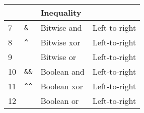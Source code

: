 \begin{table}[h]
\begin{tabular}{|l|l|l|l|}
  & \texttt{\detokenize{!=}} & Inequality & \\
\hline
7 & \texttt{\&} & Bitwise and & Left-to-right \\
\hline
8 & \texttt{\^} & Bitwise xor & Left-to-right \\
\hline
9 & \texttt{\detokenize{|}} & Bitwise or & Left-to-right \\
\hline
10 & \texttt{\&\&} & Boolean and & Left-to-right \\
\hline
11 & \texttt{\^}\texttt{\^} & Boolean xor & Left-to-right \\
\hline
12 & \texttt{\detokenize{||}} & Boolean or & Left-to-right \\
\hline
\end{tabular}\normalsize
\end{table}

\FloatBarrier

